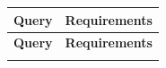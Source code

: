 \documentclass[12pt,a4paper,oneside]{article}
\theoremstyle{definition}
\begin{document}
\begin{center}
\begin{longtable}{|l|p{8cm}|}
  \hline
  \textbf{Query} & \textbf{Requirements} \\
  \hline\hline
  \endfirsthead
  \hline
  \textbf{Query} & \textbf{Requirements} \\
  \hline\hline
  \endhead
  \endlastfoot


\end{longtable}
\end{center}
\end{document}
